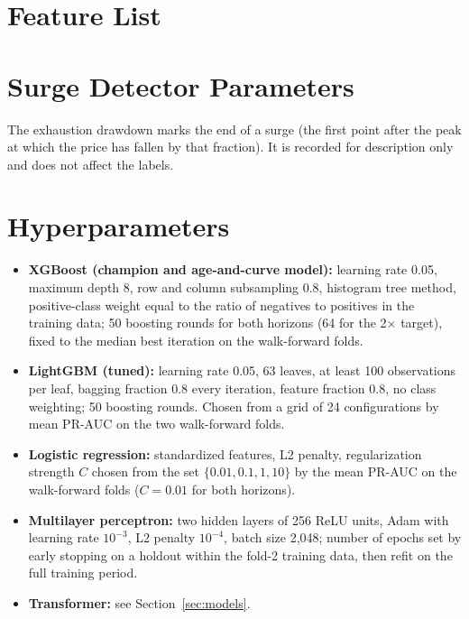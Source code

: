 \section{Feature List}
\label{app:features}

\begin{table}[h]
\centering
\caption{The 124 features used by all tabular models. Windowed features are computed over trailing windows of 10\,s, 30\,s and 120\,s and over the token's full history, and each name below stands for all of its windows.}
\label{tab:features}
\tabsize

\end{table}

\section{Surge Detector Parameters}
\label{app:detector}

\begin{table}[h]
\centering
\caption{Parameters of the three surge definitions. The primary definition is used throughout unless stated otherwise. Parameters were fixed before any model was trained.}
\label{tab:detector}
\tabsize

\end{table}

The exhaustion drawdown marks the end of a surge (the first point after the peak at which the price has fallen by that fraction). It is recorded for description only and does not affect the labels.

\section{Hyperparameters}
\label{app:hparams}

\begin{itemize}
  \item \textbf{XGBoost (champion and age-and-curve model):} learning rate 0.05, maximum depth 8, row and column subsampling 0.8, histogram tree method, positive-class weight equal to the ratio of negatives to positives in the training data; 50 boosting rounds for both horizons (64 for the 2$\times$ target), fixed to the median best iteration on the walk-forward folds.
  \item \textbf{LightGBM (tuned):} learning rate 0.05, 63 leaves, at least 100 observations per leaf, bagging fraction 0.8 every iteration, feature fraction 0.8, no class weighting; 50 boosting rounds. Chosen from a grid of 24 configurations by mean PR-AUC on the two walk-forward folds.
  \item \textbf{Logistic regression:} standardized features, L2 penalty, regularization strength $C$ chosen from the set $\{0.01, 0.1, 1, 10\}$ by the mean PR-AUC on the walk-forward folds ($C=0.01$ for both horizons).
  \item \textbf{Multilayer perceptron:} two hidden layers of 256 ReLU units, Adam with learning rate $10^{-3}$, L2 penalty $10^{-4}$, batch size 2,048; number of epochs set by early stopping on a holdout within the fold-2 training data, then refit on the full training period.
  \item \textbf{Transformer:} see Section~\ref{sec:models}.
\end{itemize}

